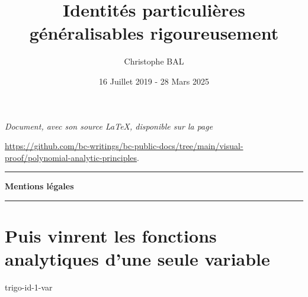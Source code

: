 \documentclass[12pt]{amsart}
\begin{document}
\title{Identités particulières généralisables rigoureusement}
\author{Christophe BAL}
\date{16 Juillet 2019 - 28 Mars 2025}

\maketitle

\begin{center}
	\itshape
	Document, avec son source \LaTeX, disponible sur la page

	\url{https://github.com/bc-writings/bc-public-docs/tree/main/visual-proof/polynomial-analytic-principles}.
\end{center}


\bigskip


\begin{center}
	\hrule\vspace{.3em}
	{
		\fontsize{1.35em}{1em}\selectfont
		\textbf{Mentions \og légales \fg}
	}

	\vspace{0.45em}
	\doclicenseThis
	\hrule
\end{center}


\bigskip


\setcounter{tocdepth}{1}
\tableofcontents



%
%
%
%
%
%
%
%
%
%
\newpage
\section{Puis vinrent les fonctions analytiques d'une seule variable}

{trigo-id-1-var}
%
%
%
%
%
\end{document}
